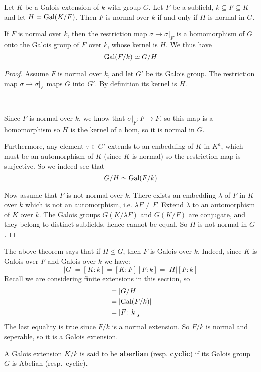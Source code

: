 \begin{theorem}\label{1.10}
    Let $K$ be a Galois extension of $k$ with group $G$. Let $F$ be a subfield, $k\subseteq F\subseteq K$ and let $H=\text{Gal}(K/F)$. Then $F$ is normal over $k$ if and only if $H$ is normal in $G$.

    If $F$ is normal over $k$, then the restriction map $\sigma\rightarrow \sigma|_F$ is a homomorphism of $G$ onto the Galois group of $F$ over $k$, whose kernel is $H$. We thus have \[
        \text{Gal}(F/k) \simeq G/H    
    \]
\begin{proof}
    Assume $F$ is normal over $k$, and let $G'$ be its Galois group. The restriction map $\sigma\rightarrow \sigma|_F$ maps $G$ into $G'$. By definition its kernel is $H$.

    \

    Since $F$ is normal over $k$, we know that $\sigma|_F\colon F\rightarrow F$, so this map is a homomorphism so $H$ is the kernel of a hom, so it is normal in $G$.

    Furthermore, any element $\tau\in G'$ extends to an embedding of $K$ in $K^a$, which must be an automorphism of $K$ (since $K$ is normal) so the restriction map is surjective. 
    So we indeed see that \[
        G/H \simeq \text{Gal}(F/k) 
    \] 

    Now assume that $F$ is not normal over $k$. There exists an embedding $\lambda$ of $F$ in $K$ over $k$ which is not an automorphism, i.e. $\lambda F\neq F$. Extend $\lambda$ to an automorphism of $K$ over $k$. The Galois groups $G(K/\lambda F)$ and $G(K/F)$ are conjugate, and they belong to distinct subfields, hence cannot be equal. So $H$ is not normal in $G$.
\end{proof}
\end{theorem}

\begin{remark}
    The above theorem says that if $H\trianglelefteq G$, then $F$ is Galois over $k$. Indeed, since $K$ is Galois over $F$ and Galois over $k$ we have:\[
        |G| = [K\colon k] = [K\colon F][F\colon k] = |H|[F\colon k]    
    \] 
    Recall we are considering finite extensions in this section, so\begin{align*}
        [F\colon k] &= |G/H|\\
                    &= |\Gal{F/k}|\\
                    &= {[F\colon k]}_s
    \end{align*}  
    The last equality is true since $F/k$ is a normal extension. So $F/k$ is normal and seperable, so it is a Galois extension.
\end{remark}
\begin{definition}
    A Galois extension $K/k$ is said to be \textbf{aberlian} (resp. \textbf{cyclic}) if its Galois group $G$ is Abelian (resp.~cyclic).
\end{definition}

